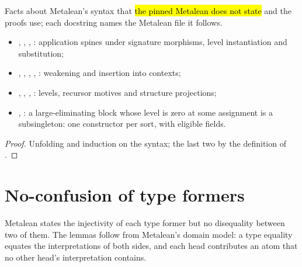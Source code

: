 \begin{lemma}
  \label{lem:EraseProof-ML-Expr-apps_succ}
  \leanok
   Facts about Metalean's syntax that \hl{the pinned Metalean does not state} and
  the proofs use; each docstring names the Metalean file it follows.
  \begin{itemize}
  \item {}, , , :
        application spines under signature morphisms, level instantiation and substitution;
  \item {}, , , ,
        : weakening and insertion into contexts;
  \item {}, , ,
        : levels, recursor motives and structure projections;
  \item {}, : a
        large-eliminating block whose level is zero at some assignment is a subsingleton: one
        constructor per sort, with eligible fields.
  \end{itemize}
\end{lemma}
\begin{proof}
  \leanok
   Unfolding and induction on the syntax; the last two by the definition of
  .
\end{proof}

\section{No-confusion of type formers}\label{sec:model-noconf}

Metalean states the injectivity of each type former but no disequality between two of them. The
lemmas follow from Metalean's domain model: a type equality equates the interpretations of both
sides, and each head contributes an atom that no other head's interpretation contains.

